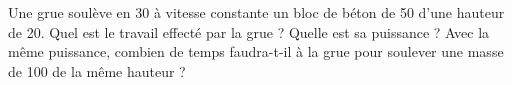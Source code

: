 

\begin{exercice}\label{exo017}
Une grue soulève en \unit{30}{\second} à vitesse constante un bloc de béton de \unit{50}{\kilogram} d'une hauteur de \unit{20}{\meter}. Quel est le travail effecté par la grue ? Quelle est sa puissance ? Avec la même puissance, combien de temps faudra-t-il à la grue pour soulever une masse de \unit{100}{\kilogram} de la même hauteur ?


\end{exercice}
